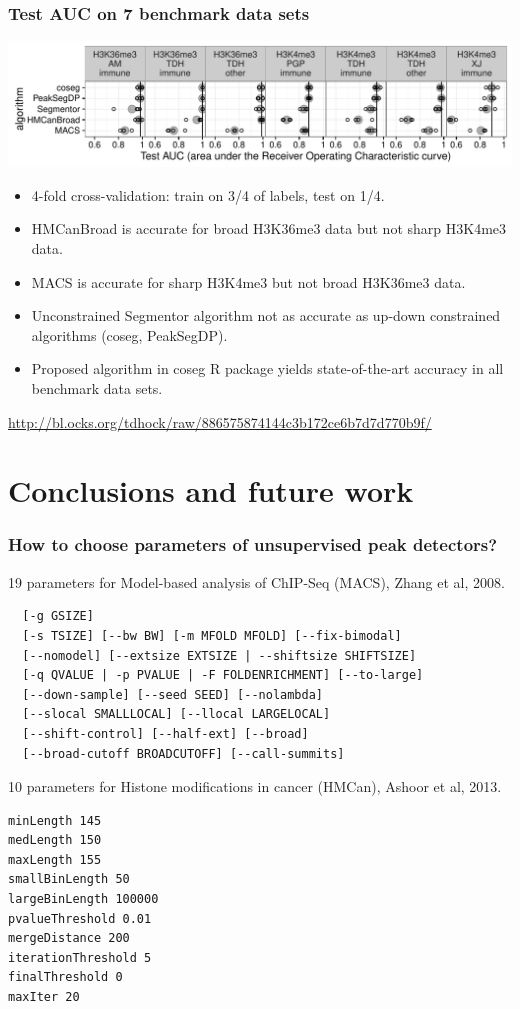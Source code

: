 \documentclass{beamer}
\begin{document}
\begin{frame}
  \frametitle{Test AUC on 7 benchmark data sets}
  \includegraphics[width=\textwidth]{figure-test-error-dots}
  \begin{itemize}
  \item 4-fold cross-validation: train on 3/4 of labels, test on 1/4.
  \item HMCanBroad is accurate for broad H3K36me3 data but not sharp H3K4me3 data.
  \item MACS is accurate for sharp H3K4me3 but not broad H3K36me3 data.
  \item Unconstrained Segmentor algorithm not as accurate as up-down
    constrained algorithms (coseg, PeakSegDP).
  \item Proposed algorithm in coseg R package yields state-of-the-art
    accuracy in all benchmark data sets.
  \end{itemize}
  \scriptsize
\url{http://bl.ocks.org/tdhock/raw/886575874144c3b172ce6b7d7d770b9f/}
\end{frame}

\section{Conclusions and future work}

\begin{frame}[fragile]
  \frametitle{How to choose parameters of unsupervised peak
    detectors?}
\scriptsize
19 parameters for Model-based analysis of ChIP-Seq (MACS), Zhang et al, 2008.
\begin{verbatim}
  [-g GSIZE]
  [-s TSIZE] [--bw BW] [-m MFOLD MFOLD] [--fix-bimodal]
  [--nomodel] [--extsize EXTSIZE | --shiftsize SHIFTSIZE]
  [-q QVALUE | -p PVALUE | -F FOLDENRICHMENT] [--to-large]
  [--down-sample] [--seed SEED] [--nolambda]
  [--slocal SMALLLOCAL] [--llocal LARGELOCAL]
  [--shift-control] [--half-ext] [--broad]
  [--broad-cutoff BROADCUTOFF] [--call-summits]
\end{verbatim}
10 parameters for Histone modifications in cancer (HMCan),
Ashoor et al, 2013.
\begin{verbatim}
minLength 145
medLength 150
maxLength 155
smallBinLength 50
largeBinLength 100000
pvalueThreshold 0.01
mergeDistance 200
iterationThreshold 5
finalThreshold 0
maxIter 20
\end{verbatim}
\end{frame}
\end{document}
